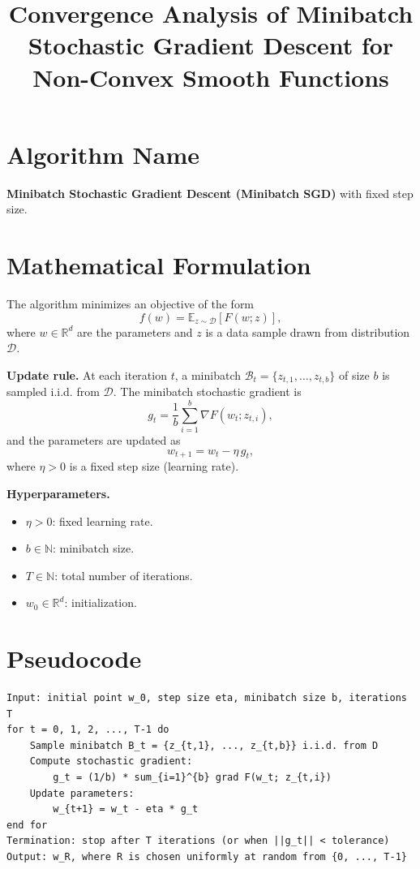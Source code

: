 \documentclass{article}
\title{Convergence Analysis of Minibatch Stochastic Gradient Descent for Non-Convex Smooth Functions}
\author{}
\date{}
\begin{document}
\maketitle

\section*{Algorithm Name}
\textbf{Minibatch Stochastic Gradient Descent (Minibatch SGD)} with fixed step size.

\section*{Mathematical Formulation}

The algorithm minimizes an objective of the form
\[
f(w) = \mathbb{E}_{z \sim \mathcal{D}}[F(w; z)],
\]
where $w \in \mathbb{R}^d$ are the parameters and $z$ is a data sample drawn from distribution $\mathcal{D}$.

\textbf{Update rule.} At each iteration $t$, a minibatch $\mathcal{B}_t = \{z_{t,1}, \dots, z_{t,b}\}$ of size $b$ is sampled i.i.d. from $\mathcal{D}$. The minibatch stochastic gradient is
\[
g_t = \frac{1}{b} \sum_{i=1}^{b} \nabla F(w_t; z_{t,i}),
\]
and the parameters are updated as
\[
w_{t+1} = w_t - \eta\, g_t,
\]
where $\eta > 0$ is a fixed step size (learning rate).

\textbf{Hyperparameters.}
\begin{itemize}
    \item $\eta > 0$: fixed learning rate.
    \item $b \in \mathbb{N}$: minibatch size.
    \item $T \in \mathbb{N}$: total number of iterations.
    \item $w_0 \in \mathbb{R}^d$: initialization.
\end{itemize}

\section*{Pseudocode}

\begin{verbatim}
Input: initial point w_0, step size eta, minibatch size b, iterations T
for t = 0, 1, 2, ..., T-1 do
    Sample minibatch B_t = {z_{t,1}, ..., z_{t,b}} i.i.d. from D
    Compute stochastic gradient:
        g_t = (1/b) * sum_{i=1}^{b} grad F(w_t; z_{t,i})
    Update parameters:
        w_{t+1} = w_t - eta * g_t
end for
Termination: stop after T iterations (or when ||g_t|| < tolerance)
Output: w_R, where R is chosen uniformly at random from {0, ..., T-1}
\end{verbatim}
\end{document}
